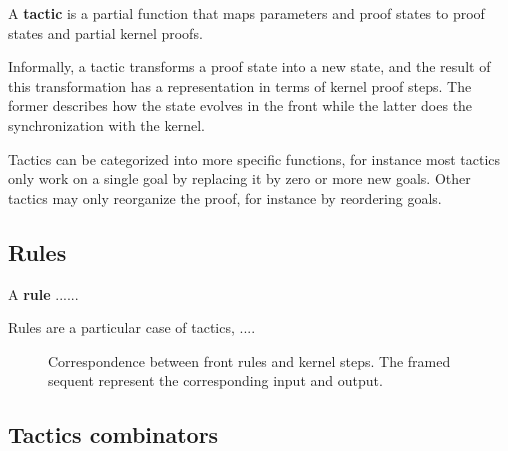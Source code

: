 \begin{definition}[Tactic]
A \textbf{tactic} is a partial function that maps parameters and proof states to proof states and partial kernel proofs.
\end{definition}

Informally, a tactic transforms a proof state into a new state, and the result of this transformation has a representation in terms of kernel proof steps. The former describes how the state evolves in the front while the latter does the synchronization with the kernel.

Tactics can be categorized into more specific functions, for instance most tactics only work on a single goal by replacing it by zero or more new goals. Other tactics may only reorganize the proof, for instance by reordering goals.

\subsection{Rules}
\label{sec:proof-framework-rules}

\begin{definition}[Rule]
A \textbf{rule} ......
\end{definition}

Rules are a particular case of tactics, ....

\begin{figure}[hbt!]
  \centering
  \label{fig:example-rule}
  \caption[Correspondence between front rules and kernel steps]{Correspondence between front rules and kernel steps. The framed sequent represent the corresponding input and output.}
\end{figure}

\subsection{Tactics combinators}

